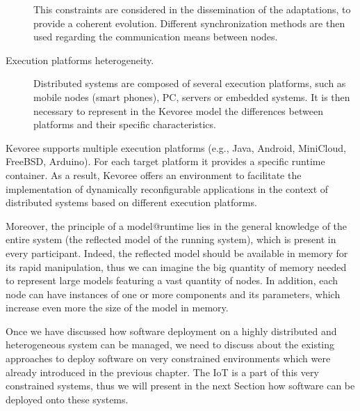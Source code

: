 \begin{description}
	This constraints are considered in the dissemination of the adaptations, to provide a coherent evolution.
	Different synchronization methods are then used regarding the communication means between nodes.
	\item [Execution platforms heterogeneity.] Distributed systems are composed of several execution platforms, such as mobile nodes (smart phones), PC, servers or embedded systems. 
	It is then necessary to represent in the Kevoree model the differences between platforms and their specific characteristics.
\end{description}

Kevoree supports multiple execution platforms (e.g., Java, Android, MiniCloud, FreeBSD, Arduino).
For each target platform it provides a specific runtime container.
As a result, Kevoree offers an environment to facilitate the implementation of dynamically reconfigurable applications in the context of distributed systems based on different execution platforms. 

Moreover, the principle of a model@runtime lies in the general knowledge of the entire system (the reflected model of the running system), which is present in every participant.
Indeed, the reflected model should be available in memory for its rapid manipulation, thus we can imagine the big quantity of memory needed to represent large models featuring a vast quantity of nodes.
In addition, each node can have instances of one or more components and its parameters, which increase even more the size of the model in memory.

Once we have discussed how software deployment on a highly distributed and heterogeneous system can be managed, we need to discuss about the existing approaches to deploy software on very constrained environments which were already introduced in the previous chapter.
The IoT is a part of this very constrained systems, thus we will present in the next Section how software can be deployed onto these systems.

